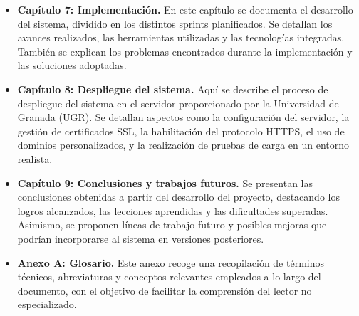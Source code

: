 \begin{itemize}
    \item \textbf{Capítulo 7: Implementación.} En este capítulo se documenta el desarrollo del sistema, dividido en los distintos sprints planificados. Se detallan los avances realizados, las herramientas utilizadas y las tecnologías integradas. También se explican los problemas encontrados durante la implementación y las soluciones adoptadas.
    
    \item \textbf{Capítulo 8: Despliegue del sistema.} Aquí se describe el proceso de despliegue del sistema en el servidor proporcionado por la Universidad de Granada (UGR). Se detallan aspectos como la configuración del servidor, la gestión de certificados SSL, la habilitación del protocolo HTTPS, el uso de dominios personalizados, y la realización de pruebas de carga en un entorno realista.
    
    \item \textbf{Capítulo 9: Conclusiones y trabajos futuros.} Se presentan las conclusiones obtenidas a partir del desarrollo del proyecto, destacando los logros alcanzados, las lecciones aprendidas y las dificultades superadas. Asimismo, se proponen líneas de trabajo futuro y posibles mejoras que podrían incorporarse al sistema en versiones posteriores.
    
    \item \textbf{Anexo A: Glosario.} Este anexo recoge una recopilación de términos técnicos, abreviaturas y conceptos relevantes empleados a lo largo del documento, con el objetivo de facilitar la comprensión del lector no especializado.
\end{itemize}